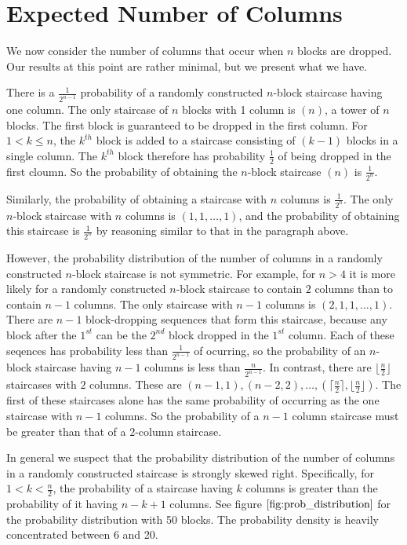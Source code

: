 \documentclass[12pt]{amsart}
\newcommand{\newsection}[2]{
\section{#1 \label{#2}}
}
\begin{document}
\newsection{Expected Number of Columns}{sec:expectedcolumns}
We now consider the number of columns that occur when $n$ blocks are dropped. Our results at this point are rather minimal, but we present what we have.

There is a $\frac{1}{2^{n-1}}$ probability of a randomly constructed $n$-block staircase having one column. The only staircase of $n$ blocks with 1 column is $(n)$, a tower of $n$ blocks. The first block is guaranteed to be dropped in the first column. For $1<k \leq n$, the $k^{th}$ block is added to a staircase consisting of $(k-1)$ blocks in a single column. The $k^{th}$ block therefore has probability $\frac{1}{2}$ of being dropped in the first cloumn. So the probability of obtaining the $n$-block staircase $(n)$ is $\frac{1}{2^n}$.

Similarly, the probability of obtaining a staircase with $n$ columns is $\frac{1}{2^{n}}$. The only $n$-block staircase with $n$ columns is $(1, 1, \ldots, 1)$, and the probability of obtaining this staircase is $\frac{1}{2^{n}}$ by reasoning similar to that in the paragraph above.

However, the probability distribution of the number of columns in a randomly constructed $n$-block staircase is not symmetric. For example, for $n > 4$ it is more likely for a randomly constructed $n$-block staircase to contain $2$ columns than to contain $n-1$ columns. The only staircase with $n-1$ columns is $(2, 1, 1, \ldots, 1)$. There are $n-1$ block-dropping sequences that form this staircase, because any block after the $1^{st}$ can be the $2^{nd}$ block dropped in the $1^{st}$ column. Each of these seqences has probability less than $\frac{1}{2^{n-1}}$ of ocurring, so the probability of an $n$-block staircase having $n-1$ columns is less than $\frac{n}{2^{n-1}}$.  In contrast, there are $\lfloor \frac{n}{2} \rfloor$ staircases with $2$ columns. These are $(n-1, 1), (n-2, 2), \ldots, (\lceil \frac{n}{2} \rceil, \lfloor \frac{n}{2} \rfloor)$. The first of these staircases alone has the same probability of occurring  as the one staircase with $n-1$ columns. So the probability of a $n-1$ column staircase must be greater than that of a $2$-column staircase.

In general we suspect that the probability distribution of the number of columns in a randomly constructed staircase is strongly skewed right. Specifically, for $1 < k < \frac{n}{2}$, the probability of a staircase having $k$ columns is greater than the probability of it having $n-k+1$ columns. See figure $\ref{fig:prob_distribution}$ for the probability distribution with 50 blocks. The probability density is heavily concentrated between 6 and 20.
\end{document}
